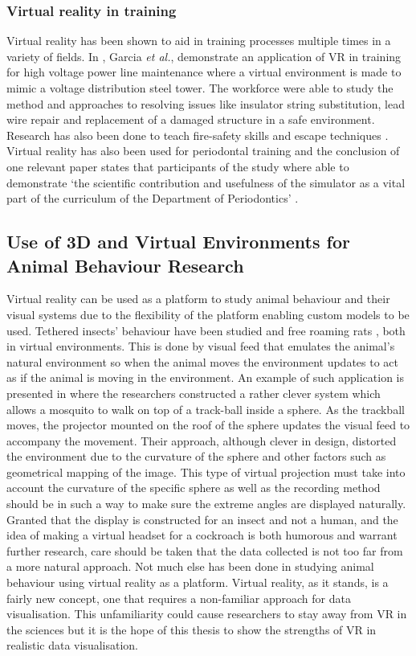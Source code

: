 \subsubsection{Virtual reality in training}
Virtual reality has been shown to aid in training processes multiple times in a variety of fields. In \cite{garcia2016virtual}, Garcia \textit{et al.}, demonstrate an application of VR in training for high voltage power line maintenance where a virtual environment is made to mimic a voltage distribution steel tower. The workforce were able to study the method and approaches to resolving issues like insulator string substitution, lead wire repair and replacement of a damaged structure in a safe environment. Research has also been done to teach fire-safety skills and escape techniques \cite{smith2009using}. Virtual reality has also been used for periodontal training  and the conclusion of one relevant paper states that participants of the study where able to demonstrate `the scientific contribution and usefulness of the simulator as a vital part of the curriculum of the Department of Periodontics' \cite{luciano2009haptics}.

\subsection{Use of 3D and Virtual Environments for Animal Behaviour Research}

Virtual reality can be used as a platform to study animal behaviour and their visual systems due to the flexibility of the platform enabling custom models to be used. Tethered insects' behaviour have been studied \cite{gray2002method} and free roaming rats \cite{o1971hippocampus, lee2009head}, both in virtual environments. This is done by visual feed that emulates the animal's natural environment so when the animal moves the environment updates to act as if the animal is moving in the environment. An example of such application is presented in \cite{takalo2012fast} where the researchers constructed a rather clever system which allows a mosquito to walk on top of a track-ball inside a sphere. As the trackball moves, the projector mounted on the roof of the sphere updates the visual feed to accompany the movement. Their approach, although clever in design, distorted the environment due to the curvature of the sphere and other factors such as geometrical mapping of the image. This type of virtual projection must take into account the curvature of the specific sphere as well as the recording method should be in such a way to make sure the extreme angles are displayed naturally. Granted that the display is constructed for an insect and not a human, and the idea of making a virtual headset for a cockroach is both humorous and warrant further research, care should be taken that the data collected is not too far from a more natural approach. Not much else has been done in studying animal behaviour using virtual reality as a platform. Virtual reality, as it stands, is a fairly new concept, one that requires a non-familiar approach for data visualisation. This unfamiliarity could cause researchers to stay away from VR in the sciences but it is the hope of this thesis to show the strengths of VR in realistic data visualisation.

